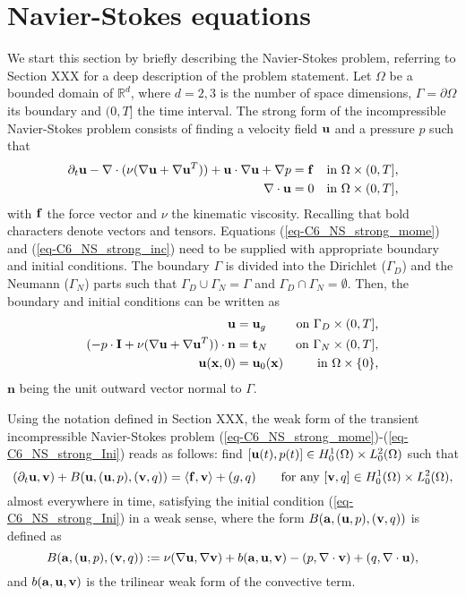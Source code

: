 \section{Navier-Stokes equations}
\label{sec-C6_NS}
We start this section by briefly describing the Navier-Stokes problem, referring to Section XXX for a deep description of the problem statement.
Let $\Omega$ be a bounded domain of $\mathbb{R}^d$, where $d=2,3$ is the number of space dimensions, $\Gamma=\partial\Omega$ its boundary and $(0,T]$ the time interval. The strong form of the incompressible Navier-Stokes problem consists of finding a velocity field ${\bf u}$ and a pressure $p$ such that 
\begin{align}
\label{eq-C6_NS_strong_mome}
\partial_t{\bf u}-\nabla\cdot(\nu(\nabla{\bf u}+\nabla{\bf u}^T))+{\bf u}\cdot\nabla{\bf u}+\nabla p&={\bf f}&\mbox{in $\Omega\times(0,T]$,}\\
\label{eq-C6_NS_strong_inc}
\nabla\cdot{\bf u}&=0&\mbox{in $\Omega\times(0,T]$,}
\end{align}
with ${\bf f}$ the force vector and $\nu$ the kinematic viscosity. Recalling that bold characters denote vectors and tensors. Equations (\ref{eq-C6_NS_strong_mome}) and (\ref{eq-C6_NS_strong_inc}) need to be supplied with appropriate boundary and initial conditions. The boundary $\Gamma$ is divided into the Dirichlet ($\Gamma_D$) and the Neumann ($\Gamma_N$) parts such that $\Gamma_D\cup\Gamma_N=\Gamma$ and $\Gamma_D\cap\Gamma_N=\emptyset$. Then, the boundary and initial conditions can be written as
\begin{align}
\label{eq-C6_NS_strong_Dir}
{\bf u}&={\bf u}_g&\mbox{on $\Gamma_D\times(0,T]$,}\\
\label{eq-C6_NS_strong_Neu}
(-p\cdot\mathbf{I}+\nu(\nabla{\bf u}+\nabla{\bf u}^T))\cdot\mathbf{n}&=\mathbf{t}_N&\mbox{on $\Gamma_N\times(0,T]$,}\\
\label{eq-C6_NS_strong_Ini}
{\bf u}({\bf x},0)&={\bf u}_0({\bf x})&\mbox{in $\Omega\times\{0\}$,}
\end{align}
$\mathbf{n}$ being the unit outward vector normal to $\Gamma$. 

Using the notation defined in Section XXX, the weak form of the transient incompressible Navier-Stokes problem (\ref{eq-C6_NS_strong_mome})-(\ref{eq-C6_NS_strong_Ini}) reads as follows: find $[{\bf u}(t),p(t)]\in H_0^1(\Omega) \times L^2_0(\Omega)$ such that
\begin{equation}
\label{eq-C6_NS_weak}
(\partial_t{\bf u},{\bf v}) + B({\bf u},({\bf u},p),({\bf v},q)) = \left<{\bf f},{\bf v}\right> + (g,q)
\quad\quad \hbox{for any}  \ [{\bf v},q ] \in H_0^1(\Omega) \times L^2_0(\Omega),
\end{equation}
almost everywhere in time, satisfying the initial condition (\ref{eq-C6_NS_strong_Ini}) in a weak sense, where the form $B({\bf a},({\bf u},p),({\bf v},q))$ is defined as 
\begin{equation}
\label{eq-C6_bilinear}
B({\bf a},({\bf u},p),({\bf v},q)):=\nu(\nabla{\bf u},\nabla{\bf v})+b({\bf a},{\bf u},{\bf v})-(p,\nabla\cdot{\bf v})+(q,\nabla\cdot{\bf u}),
\end{equation}
and $b({\bf a},{\bf u},{\bf v})$ is the trilinear weak form of the convective term.

